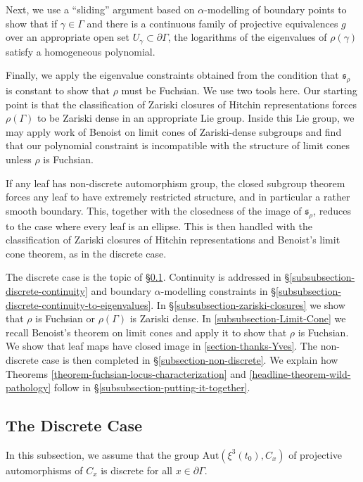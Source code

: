 \documentclass[12pt,a4paper]{amsart}
\theoremstyle{definition}
\theoremstyle{plain}
\numberwithin{equation}{section}
\begin{document}
Next, we use a ``sliding'' argument based on $\alpha$-modelling of boundary points to show that if $\gamma \in \Gamma$ and there is a continuous family of projective equivalences $g$ over an appropriate open set $U_\gamma \subset \partial \Gamma$, the logarithms of the eigenvalues of $\rho(\gamma)$ satisfy a homogeneous polynomial.

Finally, we apply the eigenvalue constraints obtained from the condition that $\mathfrak{s}_\rho$ is constant to show that $\rho$ must be Fuchsian. We use two tools here. Our starting point is that the classification of Zariski closures of Hitchin representations forces $\rho(\Gamma)$ to be Zariski dense in an appropriate Lie group. Inside this Lie group, we may apply work of Benoist on limit cones of Zariski-dense subgroups and find that our polynomial constraint is incompatible with the structure of limit cones unless $\rho$ is Fuchsian.

If any leaf has non-discrete automorphism group, the closed subgroup theorem forces any leaf to have extremely restricted structure, and in particular a rather smooth boundary. This, together with the closedness of the image of $\mathfrak{s}_\rho$, reduces to the case where every leaf is an ellipse. This is then handled with the classification of Zariski closures of Hitchin representations and Benoist's limit cone theorem, as in the discrete case.

The discrete case is the topic of \S\ref{subsection-discrete-case}. Continuity is addressed in \S \ref{subsubsection-discrete-continuity} and boundary $\alpha$-modelling constraints in \S \ref{subsubsection-discrete-continuity-to-eigenvalues}. In \S \ref{subsubsection-zariski-closures} we show that $\rho$ is Fuchsian or $\rho(\Gamma)$ is Zariski dense. In \ref{subsubsection-Limit-Cone} we recall Benoist's theorem on limit cones and apply it to show that $\rho$ is Fuchsian. We show that leaf maps have closed image in \ref{section-thanks-Yves}. The non-discrete case is then completed in \S \ref{subsection-non-discrete}. We explain how Theorems \ref{theorem-fuchsian-locus-characterization} and \ref{headline-theorem-wild-pathology} follow in \S \ref{subsubsection-putting-it-together}.

\subsection{The Discrete Case}\label{subsection-discrete-case} In this subsection, we assume that the group $\text{Aut}(\xi^3(t_0), C_x)$ of projective automorphisms of $C_x$ is discrete for all $x \in \partial \Gamma$.
\end{document}
